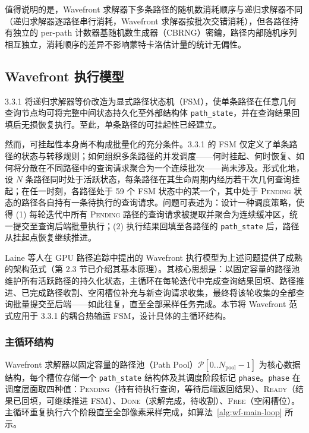 值得说明的是，Wavefront 求解器下多条路径的随机数消耗顺序与递归求解器不同（递归求解器逐路径串行消耗，Wavefront 求解器按批次交错消耗），但各路径持有独立的 per-path 计数器基随机数生成器（CBRNG）密鑰，路径内部随机序列相互独立，消耗顺序的差异不影响蒙特卡洛估计量的统计无偏性。

\subsection{Wavefront 执行模型}
\label{subsec:wf-model}

3.3.1 将递归求解器等价改造为显式路径状态机（FSM），使单条路径在任意几何查询节点均可将完整中间状态持久化至外部结构体 \texttt{path\_state}，并在查询结果回填后无损恢复执行。至此，单条路径的可挂起性已经建立。

然而，可挂起性本身尚不构成批量化的充分条件。3.3.1 的 FSM 仅定义了单条路径的状态与转移规则；如何组织多条路径的并发调度——何时挂起、何时恢复、如何将分散在不同路径中的查询请求聚合为一个连续批次——尚未涉及。形式化地，设 $N$ 条路径同时处于活跃状态，每条路径在其生命周期内经历若干次几何查询挂起；在任一时刻，各路径处于 59 个 FSM 状态中的某一个，其中处于 \textsc{Pending} 状态的路径各自持有一条待执行的查询请求。问题可表述为：设计一种调度策略，使得 (1) 每轮迭代中所有 \textsc{Pending} 路径的查询请求被提取并聚合为连续缓冲区，统一提交至查询后端批量执行；(2) 执行结果回填至各路径的 \texttt{path\_state} 后，路径从挂起点恢复继续推进。

Laine 等人\cite{laineMegakernelsConsideredHarmful2013}在 GPU 路径追踪中提出的 Wavefront 执行模型为上述问题提供了成熟的架构范式（第 2.3 节已介绍其基本原理）。其核心思想是：以固定容量的路径池维护所有活跃路径的持久化状态，主循环在每轮迭代中完成查询结果回填、路径推进、已完成路径收割、空闲槽位补充与新查询请求收集，最终将该轮收集的全部查询批量提交至后端——如此往复，直至全部采样任务完成。本节将 Wavefront 范式应用于 3.3.1 的耦合热输运 FSM，设计具体的主循环结构。

\subsubsection{主循环结构}
Wavefront 求解器以固定容量的路径池（Path Pool）$\mathcal{P}[0..N_\text{pool}-1]$ 为核心数据结构，每个槽位存储一个 \texttt{path\_state} 结构体及其调度阶段标记 \texttt{phase}。\texttt{phase} 在调度层面取四种值：\textsc{Pending}（持有待执行查询，等待后端返回结果）、\textsc{Ready}（结果已回填，可继续推进 FSM）、\textsc{Done}（求解完成，待收割）、\textsc{Free}（空闲槽位）。主循环重复执行六个阶段直至全部像素采样完成，如算法~\ref{alg:wf-main-loop} 所示。


